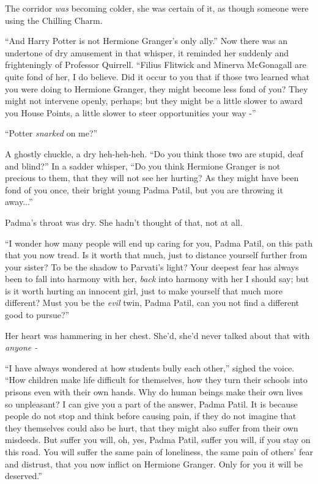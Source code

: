 The corridor \emph{was} becoming colder, she was certain of it, as
though someone were using the Chilling Charm.

``And Harry Potter is not Hermione Granger's only ally.'' Now there was
an undertone of dry amusement in that whisper, it reminded her suddenly
and frighteningly of Professor Quirrell. ``Filius Flitwick and Minerva
McGonagall are quite fond of her, I do believe. Did it occur to you that
if those two learned what you were doing to Hermione Granger, they might
become less fond of you? They might not intervene openly, perhaps; but
they might be a little slower to award you House Points, a little slower
to steer opportunities your way -''

``Potter \emph{snarked} on me?''

A ghostly chuckle, a dry heh-heh-heh. ``Do you think those two are
stupid, deaf and blind?'' In a sadder whisper, ``Do you think Hermione
Granger is not precious to them, that they will not see her hurting? As
they might have been fond of you once, their bright young Padma Patil,
but you are throwing it away...''

Padma's throat was dry. She hadn't thought of that, not at all.

``I wonder how many people will end up caring for you, Padma Patil, on
this path that you now tread. Is it worth that much, just to distance
yourself further from your sister? To be the shadow to Parvati's light?
Your deepest fear has always been to fall into harmony with her,
\emph{back} into harmony with her I should say; but is it worth hurting
an innocent girl, just to make yourself that much more different? Must
you be the \emph{evil} twin, Padma Patil, can you not find a different
good to pursue?''

Her heart was hammering in her chest. She'd, she'd never talked about
that with \emph{anyone -}

``I have always wondered at how students bully each other,'' sighed the
voice. ``How children make life difficult for themselves, how they turn
their schools into prisons even with their own hands. Why do human
beings make their own lives so unpleasant? I can give you a part of the
answer, Padma Patil. It is because people do not stop and think before
causing pain, if they do not imagine that they themselves could also be
hurt, that they might also suffer from their own misdeeds. But suffer
you will, oh, yes, Padma Patil, suffer you will, if you stay on this
road. You will suffer the same pain of loneliness, the same pain of
others' fear and distrust, that you now inflict on Hermione Granger.
Only for you it will be deserved.''

